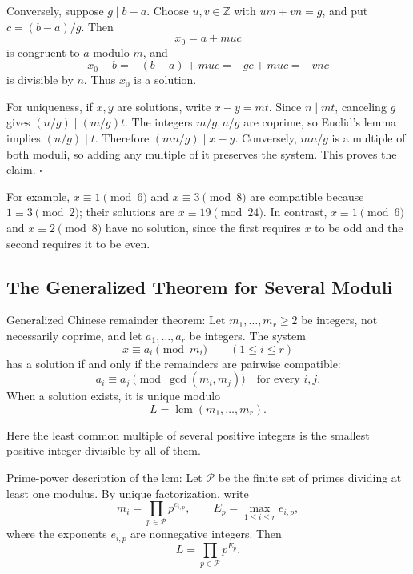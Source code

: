 \documentclass[a4paper,11pt,abstracton]{scrartcl}
\theoremstyle{dotlessP}
\theoremstyle{dotlessS}
\theoremstyle{remark}
\theoremstyle{definition}
\begin{document}
Conversely, suppose $g\mid b-a$. Choose $u,v\in\mathbb{Z}$ with
$um+vn=g$, and put $c=(b-a)/g$. Then
\[
    x_0=a+muc
\]
is congruent to $a$ modulo $m$, and
\[
    x_0-b=-(b-a)+muc=-gc+muc=-vnc
\]
is divisible by $n$. Thus $x_0$ is a solution.

For uniqueness, if $x,y$ are solutions, write $x-y=mt$.
Since $n\mid mt$, canceling $g$ gives
$(n/g)\mid(m/g)t$. The integers $m/g,n/g$ are coprime, so Euclid's
lemma implies $(n/g)\mid t$. Therefore $(mn/g)\mid x-y$.
Conversely, $mn/g$ is a multiple of both moduli, so adding any multiple
of it preserves the system. This proves the claim.
\hfill$\square$



\begin{example_box}
For example, $x\equiv1\pmod6$ and $x\equiv3\pmod8$ are compatible
because $1\equiv3\pmod2$; their solutions are $x\equiv19\pmod{24}$.
In contrast, $x\equiv1\pmod6$ and $x\equiv2\pmod8$ have no solution,
since the first requires $x$ to be odd and the second requires it to be even.
\end{example_box}


\subsection{The Generalized Theorem for Several Moduli}

\begin{mainbox}{Generalized Chinese remainder theorem:}
Let $m_1,\ldots,m_r\geq2$ be integers, not necessarily coprime, and
let $a_1,\ldots,a_r$ be integers. The system
\[
    x\equiv a_i\pmod{m_i}\qquad(1\leq i\leq r)
\]
has a solution if and only if the remainders are pairwise compatible:
\[
    \boxed{a_i\equiv a_j\pmod{\gcd(m_i,m_j)}
           \quad\text{for every }i,j.}
\]
When a solution exists, it is unique modulo
\[
    L=\operatorname{lcm}(m_1,\ldots,m_r).
\]
\end{mainbox}

\begin{definition_box}
Here the least common multiple of several positive integers is the
smallest positive integer divisible by all of them.
\end{definition_box}


\begin{mainbox}{Prime-power description of the lcm:}
Let $\mathcal{P}$ be the finite set of primes dividing at least one
modulus. By unique factorization, write
\[
    m_i=\prod_{p\in\mathcal{P}}p^{e_{i,p}},\qquad
    E_p=\max_{1\leq i\leq r}e_{i,p},
\]
where the exponents $e_{i,p}$ are nonnegative integers. Then
\[
    L=\prod_{p\in\mathcal{P}}p^{E_p}.
\]
\end{mainbox}
\end{document}

